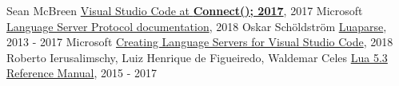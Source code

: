  Sean McBreen \href{https://code.visualstudio.com/blogs/2017/11/15/connect}{Visual Studio Code at \textbf{Connect(); 2017}}, 2017
 Microsoft \href{https://microsoft.github.io/language-server-protocol/specification#initialize}{Language Server Protocol documentation}, 2018
 Oskar Schöldström \href{https://oxyc.github.io/luaparse/}{Luaparse}, 2013 - 2017
 Microsoft \href{https://code.visualstudio.com/docs/extensions/example-language-server}{Creating Language Servers for Visual Studio Code}, 2018
 Roberto Ierusalimschy, Luiz Henrique de Figueiredo, Waldemar Celes \href{https://www.lua.org/manual/5.3/manual.html}{Lua 5.3 Reference Manual}, 2015 - 2017
